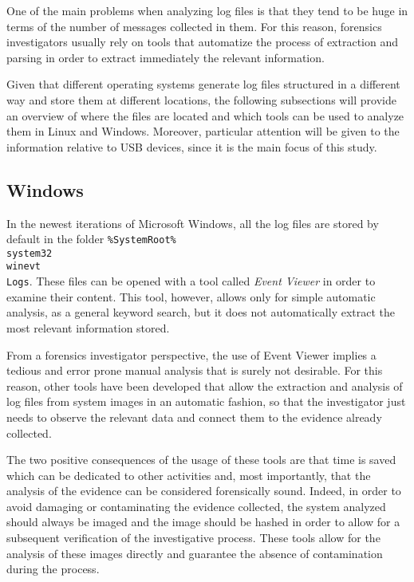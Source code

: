 \documentclass[a4paper]{article}
\begin{document}
One of the main problems when analyzing log files is that they tend to be huge
in terms of the number of messages collected in them. For this reason, forensics
investigators usually rely on tools that automatize the process of extraction
and parsing in order to extract immediately the relevant information.

Given that different operating systems generate log files structured in a
different way and store them at different locations, the following subsections
will provide an overview of where the files are located and which tools can
be used to analyze them in Linux and Windows. Moreover, particular attention
will be given to the information relative to USB devices, since it is the main
focus of this study.

\subsection{Windows}\label{sec:litWindows}
In the newest iterations of Microsoft Windows, all the log files are stored by
default in the folder \texttt{\%SystemRoot\%\\system32\\winevt\\Logs}. These
files can be opened with a tool called \emph{Event Viewer} in order to examine
their content. This tool, however, allows only for simple automatic analysis, as
a general keyword search, but it does not automatically extract the most
relevant information stored.

From a forensics investigator perspective, the use of Event Viewer implies a
tedious and error prone manual analysis that is surely not desirable. For this
reason, other tools have been developed that allow the extraction and analysis
of log files from system images in an automatic fashion, so that the
investigator just needs to observe the relevant data and connect them to the
evidence already collected.

The two positive consequences of the usage of these tools are that time is saved
which can be dedicated to other activities and, most importantly, that the
analysis of the evidence can be considered forensically sound. Indeed, in order
to avoid damaging or contaminating the evidence collected, the system analyzed
should always be imaged and the image should be hashed in order to allow for a
subsequent verification of the investigative process. These tools allow for the
analysis of these images directly and guarantee the absence of contamination
during the process.~\cite{murphey2007automated}
\end{document}
